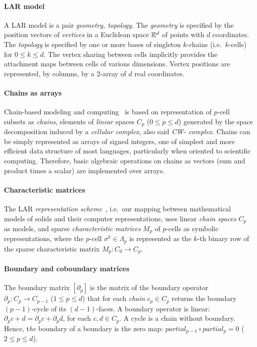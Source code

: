 \paragraph{LAR model}
A LAR model is a pair \emph{geometry, topology}. The \emph{geometry} is specified by the  position vectors of \emph{vertices} in a Euclidean space $\mathbb{E}^d$ of points with $d$ coordinates. The \emph{topology} is specified by one or more bases of singleton $k$-chains (i.e.~$k$-cells) for $0 \leq k\leq d$. The vertex sharing between cells implicitly provides the attachment maps between cells of various dimensions.
Vertex positions are represented, by columns, by a 2-array of $d$ real coordinates.

\paragraph{Chains as arrays}
Chain-based modeling and computing~\cite{DBLP:journals/corr/abs-0812-3249} is based on representation of $p$-cell subsets as \emph{chains}, elements of \emph{linear} spaces $C_p$ ($0\leq p\leq d$) generated by the space decomposition induced by a \emph{cellular complex}, also said \emph{CW- complex}.
Chains can be simply represented as arrays of signed integers, one of simplest and more efficient data structure of most languages, particularly when oriented to scientific computing.
Therefore, basic algebraic operations on chains as vectors (sum and product times a scalar) are implemented over arrays.

\paragraph{Characteristic matrices}
The LAR \emph{representation scheme}~\cite{Requicha:1980:RRS:356827.356833}, i.e.~our mapping between mathematical models of solids and their computer representations, uses linear \emph{chain spaces} $C_p$ as models, and sparse \emph{characteristic matrices} $M_p$  of $p$-cells as symbolic representations, where the $p$-cell $\sigma^k\in\Lambda_p$ is represented as the $k$-th binary row of the  sparse characteristic matrix $M_p: C_0\to C_p$.

\paragraph{Boundary and coboundary matrices}

The boundary matrix $[\partial_p]$ is the matrix of the boundary operator $\partial_p: C_p\to C_{p-1}$ ($1\leq p\leq d$) that for each \emph{chain} $c_p\in C_p$ returns the  boundary $(p-1)$-cycle of its $(d-1)$-faces.  A boundary operator is linear: $\partial_p c + d = \partial_p c + \partial_p d$, for each $c,d\in C_p$. A cycle is a chain without boundary. Hence, t\emph{he} boundary of a boundary is the zero map: $partial_{p-1} \circ partial_p = 0$ ($2\leq p\leq d$).

